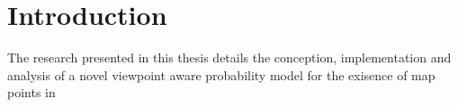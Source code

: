 \section{Introduction}

The research presented in this thesis details the conception, implementation and analysis of a novel viewpoint aware probability model for the exisence of map points in 







